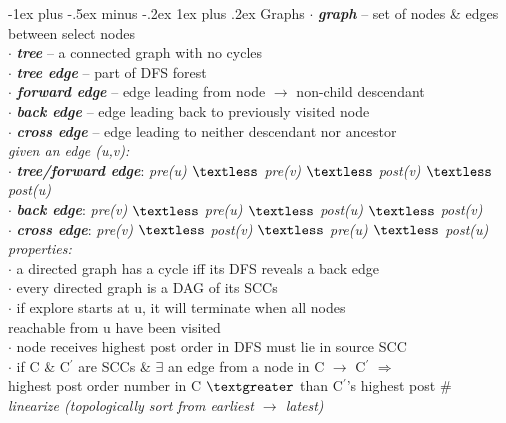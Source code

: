 \documentclass[10pt,landscape]{article}
\makeatletter
\renewcommand{\subsubsection}{\@startsection{subsubsection}{3}{0mm}%
                                {-1ex plus -.5ex minus -.2ex}%
                                {1ex plus .2ex}%
                                {\normalfont\small\bfseries}}
\makeatother
\begin{document}
\begin{multicols}{3}
\subsubsection{Graphs}
{\scriptsize\hspace{5pt} $\cdot$ \textit{\textbf{graph}} -- set of nodes \& edges between select nodes\\
\hspace{5pt} $\cdot$ \textit{\textbf{tree}} -- a connected graph with no cycles\\
\hspace{5pt} $\cdot$ \textit{\textbf{tree edge}} -- part of DFS forest\\
\hspace{5pt} $\cdot$ \textit{\textbf{forward edge}} -- edge leading from node $\rightarrow$ non-child descendant\\
\hspace{5pt} $\cdot$ \textit{\textbf{back edge}} -- edge leading back to previously visited node\\
\hspace{5pt} $\cdot$ \textit{\textbf{cross edge}} -- edge leading to neither descendant nor ancestor\\
{\it given an edge (u,v):}\\
\hspace{5pt} $\cdot$ \textit{\textbf{tree/forward edge}}: {\it pre(u) $\textless$ pre(v) $\textless$ post(v) $\textless$ post(u)} \\
\hspace{5pt} $\cdot$ \textit{\textbf{back edge}}: {\it pre(v) $\textless$ pre(u) $\textless$ post(u) $\textless$ post(v)} \\
\hspace{5pt} $\cdot$ \textit{\textbf{cross edge}}: {\it pre(v) $\textless$ post(v) $\textless$ pre(u) $\textless$ post(u)}\\
{\it properties:}\\
\hspace{5pt} $\cdot$ a directed graph has a cycle iff its DFS reveals a back edge\\
\hspace{5pt} $\cdot$ every directed graph is a DAG of its SCCs\\
\hspace{5pt} $\cdot$ if explore starts at u, it will terminate when all nodes \\\hspace{10pt}reachable from u have been visited\\
\hspace{5pt} $\cdot$ node receives highest post order in DFS must lie in source SCC\\
\hspace{5pt} $\cdot$ if C \& C$^{'}$ are SCCs \& $\exists$ an edge from a node in C $\rightarrow$ C$^{'}$ $\Rightarrow$ \\\hspace{12pt}highest post order number in C $\textgreater$ than C$^{'}$'s highest post \#\\
{\it linearize (topologically sort from earliest $\rightarrow$ latest)}
}




\end{multicols}
\end{document}
